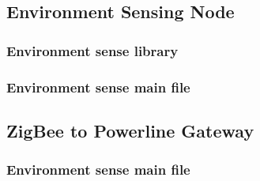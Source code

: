 \subsection{Environment Sensing Node}
\label{an:environment-code}

\subsubsection{Environment sense library}



\subsubsection{Environment sense main file}


\pagebreak

\subsection{ZigBee to Powerline Gateway}
\label{an:gateway-code}

\subsubsection{Environment sense main file}


\pagebreak




